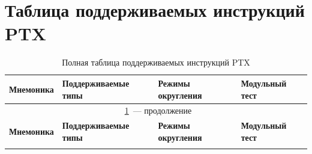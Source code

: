 \section{Таблица поддерживаемых инструкций PTX}
\label{app:instructions}

\begin{longtable}{p{4cm} p{5cm} p{2cm} p{3.5cm}}
  \caption{Полная таблица поддерживаемых инструкций PTX}
  \label{tab:supported_instructions} \\
  \toprule
  \textbf{Мнемоника} & \textbf{Поддерживаемые типы} & \textbf{Режимы округления} & \textbf{Модульный тест} \\
  \midrule
  \endfirsthead
  \multicolumn{4}{c}{\tablename\ \ref{tab:supported_instructions}~--- продолжение} \\
  \toprule
  \textbf{Мнемоника} & \textbf{Поддерживаемые типы} & \textbf{Режимы округления} & \textbf{Модульный тест} \\
  \midrule
  \endhead
  \bottomrule
  \endlastfoot


\end{longtable}
